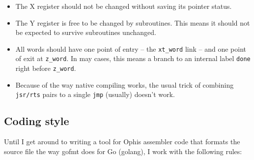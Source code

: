 \begin{itemize}

        \item The X register should not be changed without
                saving its pointer status.

        \item The Y register is free to be changed by
                subroutines. This means it should not be expected to survive
                subroutines unchanged.

        \item All words should have one point of entry -- the \texttt{xt\_word}
                link -- and one point of exit at \texttt{z\_word}. In may cases,
                this means a branch to an internal label \texttt{done} right
                before \texttt{z\_word}.

        \item Because of the way native compiling works, the usual trick of
                combining \texttt{jsr/rts} pairs to a single \texttt{jmp}
                (usually) doesn't work.

\end{itemize}


\subsection{Coding style}

Until I get around to writing a tool for Ophis assembler
code that formats the source file the way gofmt does for Go (golang),
I work with the following rules:

